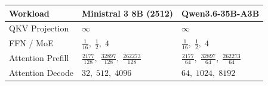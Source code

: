 \begin{tabular}{@{}lll@{}}\toprule
Workload & Ministral 3 8B (2512) & Qwen3.6-35B-A3B\\\midrule
QKV Projection & $\infty$ & $\infty$\\[4pt]
FFN / MoE & $\frac{1}{16},\;\frac{1}{2},\;4$ & $\frac{1}{16},\;\frac{1}{2},\;4$\\[4pt]
Attention Prefill & $\frac{2177}{128},\;\frac{32897}{128},\;\frac{262273}{128}$ & $\frac{2177}{64},\;\frac{32897}{64},\;\frac{262273}{64}$\\[4pt]
Attention Decode & $32,\;512,\;4096$ & $64,\;1024,\;8192$\\[4pt]
\bottomrule\end{tabular}
